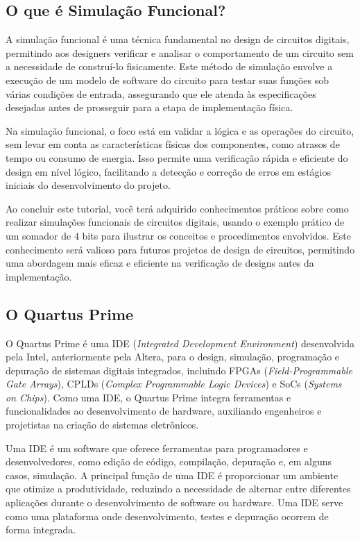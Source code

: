 \documentclass[12pt,a4paper]{article}
\begin{document}
\subsection{O que é Simulação Funcional?}

A simulação funcional é uma técnica fundamental no design de circuitos digitais, permitindo aos designers verificar e analisar o comportamento de um circuito sem a necessidade de construí-lo fisicamente. Este método de simulação envolve a execução de um modelo de software do circuito para testar suas funções sob várias condições de entrada, assegurando que ele atenda às especificações desejadas antes de prosseguir para a etapa de implementação física.

Na simulação funcional, o foco está em validar a lógica e as operações do circuito, sem levar em conta as características físicas dos componentes, como atrasos de tempo ou consumo de energia. Isso permite uma verificação rápida e eficiente do design em nível lógico, facilitando a detecção e correção de erros em estágios iniciais do desenvolvimento do projeto.

Ao concluir este tutorial, você terá adquirido conhecimentos práticos sobre como realizar simulações funcionais de circuitos digitais, usando o exemplo prático de um somador de 4 bits para ilustrar os conceitos e procedimentos envolvidos. Este conhecimento será valioso para futuros projetos de design de circuitos, permitindo uma abordagem mais eficaz e eficiente na verificação de designs antes da implementação.

\subsection{O Quartus Prime}

O Quartus Prime \cite{QuartusPrimeUserGuide} é uma IDE (\textit{Integrated Development Environment}) desenvolvida pela Intel, anteriormente pela Altera, para o design, simulação, programação e depuração de sistemas digitais integrados, incluindo FPGAs (\textit{Field-Programmable Gate Arrays}), CPLDs (\textit{Complex Programmable Logic Devices}) e SoCs (\textit{Systems on Chips}). Como uma IDE, o Quartus Prime integra ferramentas e funcionalidades ao desenvolvimento de hardware, auxiliando engenheiros e projetistas na criação de sistemas eletrônicos.

Uma IDE é um software que oferece ferramentas para programadores e desenvolvedores, como edição de código, compilação, depuração e, em alguns casos, simulação. A principal função de uma IDE é proporcionar um ambiente que otimize a produtividade, reduzindo a necessidade de alternar entre diferentes aplicações durante o desenvolvimento de software ou hardware. Uma IDE serve como uma plataforma onde desenvolvimento, testes e depuração ocorrem de forma integrada.
\end{document}
